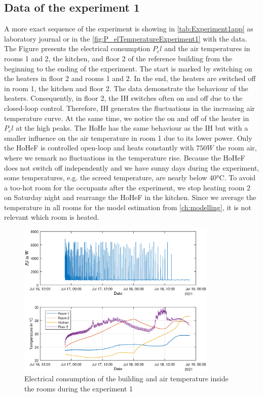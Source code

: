 \subsection{Data of the experiment 1}
\label{subsec:Data of the experiment 1}
A more exact sequence of the experiment is showing in \autoref{tab:Experiment1app} as laboratory journal or in the \autoref{fig:P_elTemperatureExperiment1} with the data. The Figure presents the electrical consumption $P_el$ and the air temperatures in rooms 1 and 2, the kitchen, and floor 2 of the reference building from the beginning to the ending of the experiment. The start is marked by switching on the heaters in floor 2 and rooms 1 and 2. In the end, the heaters are switched off in room 1, the kitchen and floor 2. \newline 
The data demonstrate the behaviour of the heaters. Consequently, in floor 2, the IH switches often on and off due to the closed-loop control. Therefore, IH generates the fluctuations in the increasing air temperature curve. At the same time, we notice the on and off of the heater in $P_el$ at the high peaks. The HoHe has the same behaviour as the IH but with a smaller influence on the air temperature in room 1 due to its lower power. \newline
Only the HoHeF is controlled open-loop and heats constantly with $750 W$ the room air, where we remark no fluctuations in the temperature rise. Because the HoHeF does not switch off independently and we have sunny days during the experiment, some temperatures, e.g. the screed temperature, are nearly below 40°C. To avoid a too-hot room for the occupants after the experiment, we stop heating room 2 on Saturday night and rearrange the HoHeF in the kitchen. Since we average the temperature in all rooms for the model estimation from \autoref{ch:modelling}, it is not relevant which room is heated.
\begin{figure}
            \centering
            \includegraphics[width=0.85\textwidth]{figure/P_el_trainingsdaten_latex.eps}
           \caption{Electrical consumption of the building and air temperature inside the rooms during the experiment 1}
           \label{fig:P_elTemperatureExperiment1}
    \end{figure}
